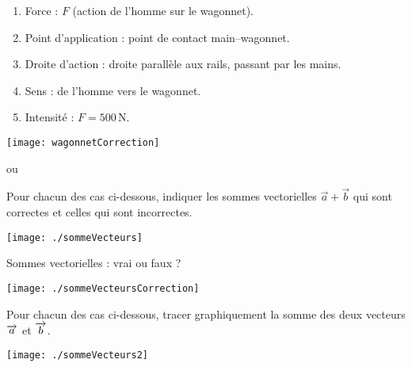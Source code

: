 \begin{corrige}
\begin{enumerate}
\item Force : $F$ (action de l'homme sur le wagonnet).
\item Point d'application : point de contact main--wagonnet.
\item Droite d'action : droite parallèle aux rails, passant par les mains.
\item Sens : de l'homme vers le wagonnet.
\item Intensité : $F=500$\,N. 
\end{enumerate}

\vspace{1em}

\begin{center}
   \texttt{[image: wagonnetCorrection]}
 
\end{center}

\end{corrige}


\begin{exercice} ou 
\label{exAddVect}

Pour chacun des cas ci-dessous, indiquer les sommes vectorielles $\vec{a}+\vec{b}$ qui sont correctes et celles qui sont incorrectes.

\vspace{1em}
\begin{center}
    \texttt{[image: ./sommeVecteurs]}   
\end{center}

\end{exercice}





\begin{corrige}
Sommes vectorielles : vrai ou faux ?

\begin{center}
    \texttt{[image: ./sommeVecteursCorrection]}   
\end{center}

\end{corrige}








\begin{exercice}
Pour chacun des cas ci-dessous, tracer graphiquement la somme des deux vecteurs $\overrightarrow{a}$ et $\overrightarrow{b}$.

\vspace{1em}
\begin{center}
    \texttt{[image: ./sommeVecteurs2]}   
\end{center}

\end{exercice}


